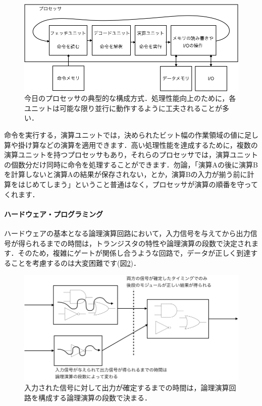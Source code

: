 \documentclass[a4paper,dvipdfmx]{jsarticle}
\begin{document}
 \begin{figure}[H]
  \begin{center}
   \includegraphics[width=.8\textwidth]{chapter01_figures/processor_model_image.png}
  \end{center}
  \caption{今日のプロセッサの典型的な構成方式．処理性能向上のために，各ユニットは可能な限り並行に動作するように工夫されることが多い．\label{fig:processor_model_image}}
 \end{figure}

命令を実行する，演算ユニットでは，決められたビット幅の作業領域の値に足し算や掛け算などの演算を適用できます．高い処理性能を達成するために，複数の演算ユニットを持つプロセッサもあり，それらのプロセッサでは，演算ユニットの個数分だけ同時に命令を処理することができます．勿論，「演算Aの後に演算Bを計算しないと演算Aの結果が保存されない，とか，演算Bの入力が揃う前に計算をはじめてしまう」ということ普通はなく，プロセッサが演算の順番を守ってくれます．

\paragraph{ハードウェア・プログラミング}

ハードウェアの基本となる論理演算回路において，入力信号を与えてから出力信号が得られるまでの時間は，トランジスタの特性や論理演算の段数で決定されます．そのため，複雑にゲートが関係し合うような回路で，データが正しく到達することを考慮するのは大変困難です(図\ref{fig:async_logic_timing})．

 \begin{figure}[H]
  \begin{center}
   \includegraphics[width=.8\textwidth]{chapter01_figures/async_logic_timing.png}
  \end{center}
  \caption{入力された信号に対して出力が確定するまでの時間は，論理演算回路を構成する論理演算の段数で決まる．\label{fig:async_logic_timing}}
 \end{figure}
\end{document}
